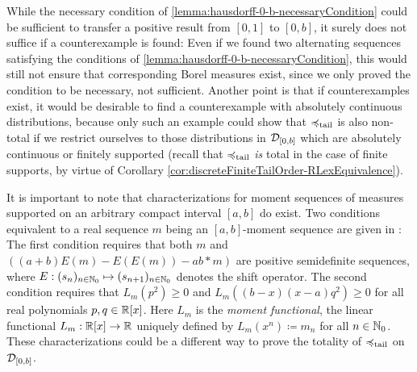 \documentclass[a4paper]{scrreprt}
\theoremstyle{definition}
\begin{document}
    While the necessary condition of \ref{lemma:hausdorff-0-b-necessaryCondition} could be sufficient to transfer a positive result from $[0, 1]$ to $[0, b]$, it surely does not suffice if a counterexample is found: Even if we found two alternating sequences satisfying the conditions of \ref{lemma:hausdorff-0-b-necessaryCondition}, this would still not ensure that corresponding Borel measures exist, since we only proved the condition to be necessary, not sufficient.
    Another point is that if counterexamples exist, it would be desirable to find a counterexample with absolutely continuous distributions, because only such an example could show that $\preccurlyeq_{\text{tail}}$ is also non-total if we restrict ourselves to those distributions in $\mathcal{D}_{[0, b]}$ which are absolutely continuous or finitely supported (recall that $\preccurlyeq_{\text{tail}}$ \emph{is} total in the case of finite supports, by virtue of Corollary \ref{cor:discreteFiniteTailOrder-RLexEquivalence}).
    
    It is important to note that characterizations for moment sequences of measures supported on an arbitrary compact interval $[a, b]$ do exist.
    Two conditions equivalent to a real sequence $m$ being an $[a, b]$-moment sequence are given in \cite[Theorem 3.13]{bib:schmuedgenTheMomentProblem}:
    The first condition requires that both $m$ and $((a+b)E(m) - E(E(m)) - ab*m)$ are positive semidefinite sequences, where $E: (s_n)_{n \in \mathbb{N}_0} \mapsto (s_{n+1})_{n \in \mathbb{N}_0}$ denotes the shift operator.
    The second condition requires that $L_m(p^2) \geq 0$ and $L_m((b-x)(x-a)q^2) \geq 0$ for all real polynomials $p, q \in \mathbb{R}[x]$. Here $L_m$ is the \emph{moment functional}, the linear functional $L_m: \mathbb{R}[x] \to \mathbb{R}$ uniquely defined by $L_m(x^n) \coloneqq m_n$ for all $n \in \mathbb{N}_0$.
    These characterizations could be a different way to prove the totality of $\preccurlyeq_{\text{tail}}$ on $\mathcal{D}_{[0, b]}$.
    
\end{document}
